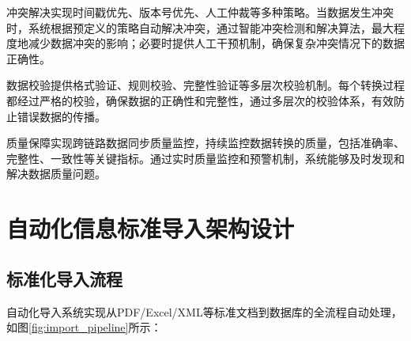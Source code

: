 冲突解决实现时间戳优先、版本号优先、人工仲裁等多种策略。当数据发生冲突时，系统根据预定义的策略自动解决冲突，通过智能冲突检测和解决算法，最大程度地减少数据冲突的影响；必要时提供人工干预机制，确保复杂冲突情况下的数据正确性。

数据校验提供格式验证、规则校验、完整性验证等多层次校验机制。每个转换过程都经过严格的校验，确保数据的正确性和完整性，通过多层次的校验体系，有效防止错误数据的传播。

质量保障实现跨链路数据同步质量监控，持续监控数据转换的质量，包括准确率、完整性、一致性等关键指标。通过实时质量监控和预警机制，系统能够及时发现和解决数据质量问题。

\section{自动化信息标准导入架构设计}

\subsection{标准化导入流程}

自动化导入系统实现从PDF/Excel/XML等标准文档到数据库的全流程自动处理，如图\ref{fig:import_pipeline}所示：

